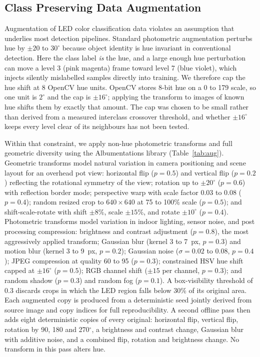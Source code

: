 ﻿\documentclass[journal]{IEEEtran}
\begin{document}
\subsection{Class Preserving Data Augmentation}
Augmentation of LED color classification data violates an assumption that underlies most detection pipelines. Standard photometric augmentation perturbs hue by $\pm 20$ to $30^{\circ}$ because object identity is hue invariant in conventional detection. Here the class label \emph{is} the hue, and a large enough hue perturbation can move a level 3 (pink magenta) frame toward level 7 (blue violet), which injects silently mislabelled samples directly into training. We therefore cap the hue shift at 8 OpenCV hue units. OpenCV stores 8-bit hue on a 0 to 179 scale, so one unit is $2^{\circ}$ and the cap is $\pm 16^{\circ}$; applying the transform to images of known hue shifts them by exactly that amount. The cap was chosen to be small rather than derived from a measured interclass crossover threshold, and whether $\pm 16^{\circ}$ keeps every level clear of its neighbours has not been tested.

Within that constraint, we apply non-hue photometric transforms and full geometric diversity using the Albumentations library (Table~\ref{tab:aug}). Geometric transforms model natural variation in camera positioning and scene layout for an overhead pot view: horizontal flip ($p=0.5$) and vertical flip ($p=0.2$) reflecting the rotational symmetry of the view; rotation up to $\pm 20^{\circ}$ ($p=0.6$) with reflection border mode; perspective warp with scale factor 0.03 to 0.08 ($p=0.4$); random resized crop to $640 \times 640$ at 75 to 100\% scale ($p=0.5$); and shift-scale-rotate with shift $\pm 8\%$, scale $\pm 15\%$, and rotate $\pm 10^{\circ}$ ($p=0.4$). Photometric transforms model variation in indoor lighting, sensor noise, and post processing compression: brightness and contrast adjustment ($p=0.8$), the most aggressively applied transform; Gaussian blur (kernel 3 to 7~px, $p=0.3$) and motion blur (kernel 3 to 9~px, $p=0.2$); Gaussian noise ($\sigma = 0.02$ to $0.08$, $p=0.4$); JPEG compression at quality 60 to 95 ($p=0.3$); constrained HSV hue shift capped at $\pm 16^{\circ}$ ($p=0.5$); RGB channel shift ($\pm 15$ per channel, $p=0.3$); and random shadow ($p=0.3$) and random fog ($p=0.1$). A box-visibility threshold of 0.3 discards crops in which the LED region falls below 30\% of its original area. Each augmented copy is produced from a deterministic seed jointly derived from source image and copy indices for full reproducibility. A second offline pass then adds eight deterministic copies of every original: horizontal flip, vertical flip, rotation by 90, 180 and 270$^{\circ}$, a brightness and contrast change, Gaussian blur with additive noise, and a combined flip, rotation and brightness change. No transform in this pass alters hue.
\end{document}
